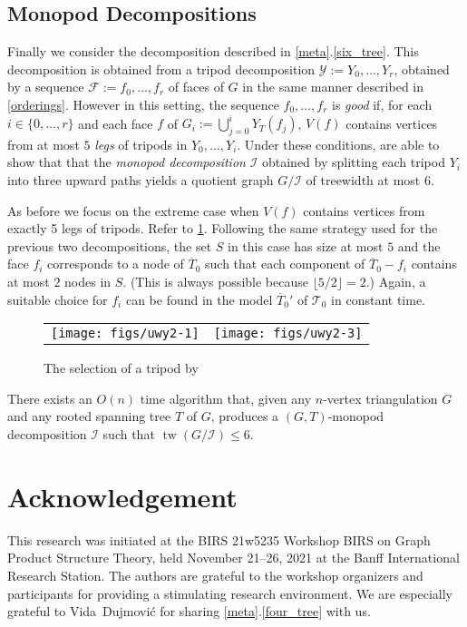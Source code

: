 \documentclass{patmorin}
\DeclareMathOperator{\tw}{tw}
\begin{document}
\subsection{Monopod Decompositions}

Finally we consider the decomposition described in \cref{meta}.\ref{six_tree}.   This decomposition is obtained from a tripod decomposition $\mathcal{Y}:=Y_0,\ldots,Y_r$, obtained by a sequence $\mathcal{F}:=f_0,\ldots,f_r$ of faces of $G$ in the same manner described in \cref{orderings}.  However in this setting, the sequence $f_0,\ldots,f_r$ is \emph{good} if, for each $i\in\{0,\ldots,r\}$ and each face $f$ of $G_i:=\bigcup_{j=0}^i Y_T(f_j)$, $V(f)$ contains vertices from at most $5$ \emph{legs} of tripods in $Y_{0},\ldots,Y_i$.  Under these conditions, \citet{ueckerdt.wood.ea:improved} are able to show that that the \emph{monopod decomposition} $\mathcal{I}$ obtained by splitting each tripod $Y_i$ into three upward paths yields a quotient graph $G/\mathcal{I}$ of treewidth at most $6$.

As before we focus on the extreme case when $V(f)$ contains vertices from exactly 5 legs of tripods. Refer to \cref{uwy}. Following the same strategy used for the previous two decompositions, the set $S$ in this case has size at most $5$ and the face $f_i$ corresponds to a node of $\overline{T}_0$ such that each component of $\overline{T}_0-f_i$ contains at most $2$ nodes in $S$.  (This is always possible because $\lfloor 5/2\rfloor=2$.)  Again, a suitable choice for $f_i$ can be found in the model $\overline{T}_0'$ of $\mathcal{T}_0$ in constant time.

\begin{figure}[htbp]
  \begin{center}
    \begin{tabular}{cc}
       \texttt{[image: figs/uwy2-1]} &
       \texttt{[image: figs/uwy2-3]}
     \end{tabular}
  \end{center}
  \caption{The selection of a tripod by \citet{ueckerdt.wood.ea:improved}}
  \label{uwy}
\end{figure}


\begin{thm}\label{monopod_decomposition_algorithm}
  There exists an $O(n)$ time algorithm that, given any $n$-vertex triangulation $G$ and any rooted spanning tree $T$ of $G$, produces a $(G,T)$-monopod decomposition $\mathcal{I}$ such that $\tw(G/\mathcal{I})\le 6$.
\end{thm}


\section*{Acknowledgement}

This research was initiated at the BIRS 21w5235 Workshop BIRS on Graph Product Structure Theory, held November 21--26, 2021 at the Banff International Research Station.  The authors are grateful to the workshop organizers and participants for providing a stimulating research environment.  We are especially grateful to Vida~Dujmović for sharing \cref{meta}.\ref{four_tree} with us.




\end{document}
